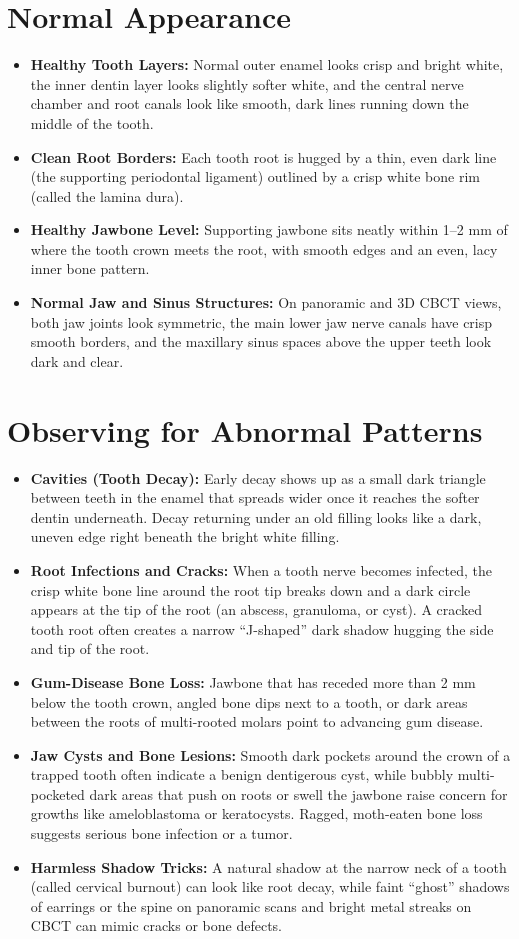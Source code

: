 \section{Normal Appearance}
\begin{itemize}
\item \textbf{Healthy Tooth Layers:} Normal outer enamel looks crisp and bright white, the inner dentin layer looks slightly softer white, and the central nerve chamber and root canals look like smooth, dark lines running down the middle of the tooth.
\item \textbf{Clean Root Borders:} Each tooth root is hugged by a thin, even dark line (the supporting periodontal ligament) outlined by a crisp white bone rim (called the lamina dura).
\item \textbf{Healthy Jawbone Level:} Supporting jawbone sits neatly within 1--2 mm of where the tooth crown meets the root, with smooth edges and an even, lacy inner bone pattern.
\item \textbf{Normal Jaw and Sinus Structures:} On panoramic and 3D CBCT views, both jaw joints look symmetric, the main lower jaw nerve canals have crisp smooth borders, and the maxillary sinus spaces above the upper teeth look dark and clear.
\end{itemize}

\section{Observing for Abnormal Patterns}
\begin{itemize}
\item \textbf{Cavities (Tooth Decay):} Early decay shows up as a small dark triangle between teeth in the enamel that spreads wider once it reaches the softer dentin underneath. Decay returning under an old filling looks like a dark, uneven edge right beneath the bright white filling.
\item \textbf{Root Infections and Cracks:} When a tooth nerve becomes infected, the crisp white bone line around the root tip breaks down and a dark circle appears at the tip of the root (an abscess, granuloma, or cyst). A cracked tooth root often creates a narrow ``J-shaped'' dark shadow hugging the side and tip of the root.
\item \textbf{Gum-Disease Bone Loss:} Jawbone that has receded more than 2 mm below the tooth crown, angled bone dips next to a tooth, or dark areas between the roots of multi-rooted molars point to advancing gum disease.
\item \textbf{Jaw Cysts and Bone Lesions:} Smooth dark pockets around the crown of a trapped tooth often indicate a benign dentigerous cyst, while bubbly multi-pocketed dark areas that push on roots or swell the jawbone raise concern for growths like ameloblastoma or keratocysts. Ragged, moth-eaten bone loss suggests serious bone infection or a tumor.
\item \textbf{Harmless Shadow Tricks:} A natural shadow at the narrow neck of a tooth (called cervical burnout) can look like root decay, while faint ``ghost'' shadows of earrings or the spine on panoramic scans and bright metal streaks on CBCT can mimic cracks or bone defects.
\end{itemize}

